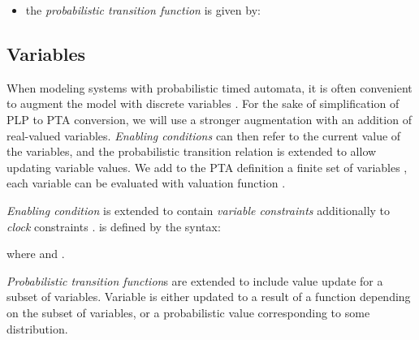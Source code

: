 \begin{itemize}
\item the \textit{\textit{probabilistic transition function}} is given by:  
\end{itemize}
\begin{center}  \end{center} \newline
\subsection{Variables}
When modeling systems with probabilistic timed automata, it is often convenient to augment the model with discrete variables \cite{behrmann2006uppaal} \cite{tri98}. For the sake of simplification of PLP to PTA conversion, we will use a stronger augmentation with an addition of real-valued variables. \textit{Enabling conditions} can then refer to the current value of the variables, and the probabilistic transition relation is extended to allow updating variable values. We add to the PTA definition a finite set of variables  , each variable can be evaluated with valuation function . 
\par \textit{Enabling condition} is extended to contain \textit{variable constraints} additionally to \textit{clock} constraints .  is defined by the syntax: \begin{center} \end{center}
where  and .
\par \textit{\textit{Probabilistic transition function}}s are extended to include value update for a subset of variables. Variable is either updated to a result of a function depending on the subset of variables, or a probabilistic value corresponding to some distribution. \\
